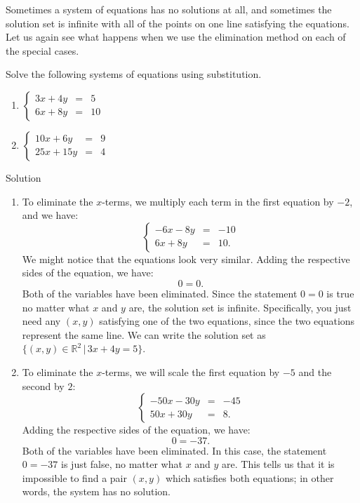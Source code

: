 Sometimes a system of equations has no solutions at all, and sometimes the solution set is infinite with all of the points on one line satisfying the equations. Let us again see what happens when we use the elimination method on each of the special cases.



\begin{example} \label{syst_lin_eq_elimination_ex3}
Solve the following systems of equations using substitution.
\begin{multicols}{2}
\begin{enumerate}
	\item $\left\{ \begin{array}{rcl} 3x+4y&=&5 \\[0.1cm] 6x+8y&=&10  \end{array} \right. $
	\item $\left\{ \begin{array}{rcl}10x+6y&=&9 \\[0.1cm] 25x+15y&=&4  \end{array} \right. $
\end{enumerate}
\end{multicols}
	
	
Solution 
	
\begin{enumerate}
\item To eliminate the $x$-terms, we multiply each term in the first equation by $-2$, and we have:
\[ \left\{ \begin{array}{rcl} -6x-8y&=&-10 \\[0.1cm] 6x+8y&=&10.  \end{array} \right. \]
We might notice that the equations look very similar. Adding the respective sides of the equation, we have:
\[ 0=0. \]
Both of the variables have been eliminated. Since the statement $0=0$ is true no matter what $x$ and $y$ are, the solution set is infinite. Specifically, you just need any $(x,y)$ satisfying one of the two equations, since the two equations represent the same line. We can write the solution set as $\{ (x,y) \in \mathbb{R}^2 \, | \, 3x+4y=5 \}$.		
		
	
\item To eliminate the $x$-terms, we will scale the first equation by $-5$ and the second by $2$:
\[ \left\{ \begin{array}{rcl} -50x-30y&=&-45 \\ 50x+30y&=&8.  \end{array} \right. \]
Adding the respective sides of the equation, we have:
\[ 0=-37. \]
Both of the variables have been eliminated. In this case, the statement $0=-37$ is just false, no matter what $x$ and $y$ are. This tells us that it is impossible to find a pair $(x,y)$ which satisfies both equations; in other words, the system has no solution. 		
		
\end{enumerate}
	
\end{example}

